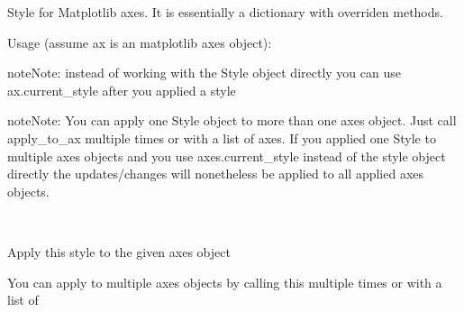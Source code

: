 \documentclass[letterpaper,10pt,openany,oneside,english]{sphinxmanual}
\begin{document}
\begin{fulllineitems}
\label{\detokenize{config:config.Style}}
Style for Matplotlib axes.  
It is essentially a dictionary with overriden methods.

Usage (assume ax is an matplotlib axes object):

\begin{sphinxVerbatim}[commandchars=\\\{\}]
    
   
\PYG{p}{[}\PYG{p}{]}  
    
\end{sphinxVerbatim}

\begin{sphinxadmonition}{note}{Note:}
instead of working with the Style object directly you can use ax.current\_style after  
you applied a style
\end{sphinxadmonition}

\begin{sphinxadmonition}{note}{Note:}
You can apply one Style object to more than one axes object. Just call apply\_to\_ax  
multiple times or with a list of axes. If you applied one Style to multiple axes objects  
and you use axes.current\_style instead of the style object directly the updates/changes  
will nonetheless be applied to all applied axes objects.
\end{sphinxadmonition}

\begin{fulllineitems}
\label{\detokenize{config:config.Style.apply_to_ax}}~
\begin{DUlineblock}{0em}
\item[] Apply this style to the given axes object  
\item[] You can apply to multiple axes objects by calling this multiple times or with a list of  
\end{DUlineblock}


\end{fulllineitems}
\end{fulllineitems}
\end{document}
